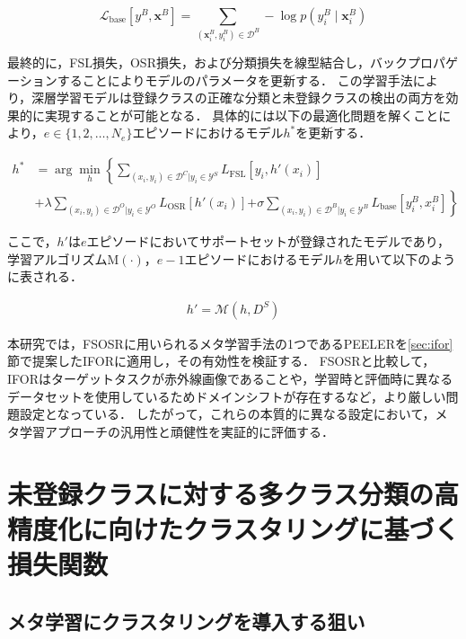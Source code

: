 \documentclass[a4paper,11pt,nomag]{jsreport}
\begin{document}
\begin{equation}
  \mathcal{L}_{\mathrm{base}} [y^B, \bm{x}^B] = \sum_{(\bm{x}^B_i,y^B_i) \in \mathcal{D}^B} - \log {p(y^B_i \mid \bm{x}^B_i)}
\end{equation}

最終的に，FSL損失，OSR損失，および分類損失を線型結合し，バックプロパゲーションすることによりモデルのパラメータを更新する．
この学習手法により，深層学習モデルは登録クラスの正確な分類と未登録クラスの検出の両方を効果的に実現することが可能となる．
具体的には以下の最適化問題を解くことにより，$e \in \{1, 2, \ldots, N_e\}$エピソードにおけるモデル$h^*$を更新する．

\begin{align}
  h^* & = \arg \min_h \left\{ \sum_{(x_i,y_i) \in \mathcal{D}^C|y_i \in \mathcal{Y}^S}{L_{\mathrm{FSL}}[y_i,h'(x_i)]} \right. \nonumber \\
      & + \lambda \sum_{(x_i,y_i) \in \mathcal{D}^O|y_i \in \mathcal{Y}^O}{L_{\mathrm{OSR}}[h'(x_i)]}
        \left. + \sigma \sum_{(x_i,y_i) \in \mathcal{D}^B|y_i \in \mathcal{Y}^B}{L_{\mathrm{base}}[y^B_i,x^B_i]} \right\}
\end{align}

\noindent
ここで，$h'$は$e$エピソードにおいてサポートセットが登録されたモデルであり，
学習アルゴリズム$\mathrm{M}(\cdot)$，$e-1$エピソードにおけるモデル$h$を用いて以下のように表される．

\begin{align}
  h' = \mathcal{M}(h, D^S)
\end{align}

本研究では，FSOSRに用いられるメタ学習手法の1つであるPEELERを\ref{sec:ifor}節で提案したIFORに適用し，その有効性を検証する．
FSOSRと比較して，IFORはターゲットタスクが赤外線画像であることや，学習時と評価時に異なるデータセットを使用しているためドメインシフトが存在するなど，より厳しい問題設定となっている．
したがって，これらの本質的に異なる設定において，メタ学習アプローチの汎用性と頑健性を実証的に評価する．

\section{未登録クラスに対する多クラス分類の高精度化に向けたクラスタリングに基づく損失関数}

\subsection{メタ学習にクラスタリングを導入する狙い}
\label{subsec:purpose}
\end{document}
